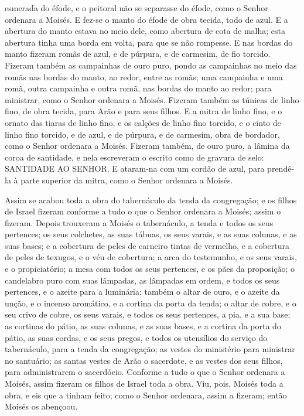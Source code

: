 esmerada do éfode, e o peitoral não se separasse do éfode, como o
Senhor ordenara a Moisés. E fez-se o manto do éfode de obra
tecida, todo de azul. E a abertura do manto estava no meio
dele, como abertura de cota de malha; esta abertura tinha uma borda
em volta, para que se não rompesse. E nas bordas do manto
fizeram romãs de azul, e de púrpura, e de carmesim, de fio torcido.
Fizeram também as campainhas de ouro puro, pondo as
campainhas no meio das romãs nas bordas do manto, ao redor, entre as
romãs; uma campainha e uma romã, outra campainha e outra
romã, nas bordas do manto ao redor; para ministrar, como o Senhor
ordenara a Moisés. Fizeram também as túnicas de linho fino,
de obra tecida, para Arão e para seus filhos. E a mitra de
linho fino, e o ornato das tiaras de linho fino, e os calções de
linho fino torcido, e o cinto de linho fino torcido, e de
azul, e de púrpura, e de carmesim, obra de bordador, como o Senhor
ordenara a Moisés. Fizeram também, de ouro puro, a lâmina da
coroa de santidade, e nela escreveram o escrito como de gravura de
selo: SANTIDADE AO SENHOR. E ataram-na com um cordão de azul,
para prendê-la à parte superior da mitra, como o Senhor ordenara a
Moisés.

Assim se acabou toda a obra do tabernáculo da tenda da
congregação; e os filhos de Israel fizeram conforme a tudo o que o
Senhor ordenara a Moisés; assim o fizeram. Depois trouxeram a
Moisés o tabernáculo, a tenda e todos os seus pertences; os seus
colchetes, as suas tábuas, os seus varais, e as suas colunas, e as
suas bases; e a cobertura de peles de carneiro tintas de
vermelho, e a cobertura de peles de texugos, e o véu de cobertura;
a arca do testemunho, e os seus varais, e o propiciatório;
a mesa com todos os seus pertences, e os pães da proposição;
o candelabro puro com suas lâmpadas, as lâmpadas em ordem, e
todos os seus pertences, e o azeite para a luminária; também
o altar de ouro, e o azeite da unção, e o incenso aromático, e a
cortina da porta da tenda; o altar de cobre, e o seu crivo de
cobre, os seus varais, e todos os seus pertences, a pia, e a sua
base; as cortinas do pátio, as suas colunas, e as suas bases,
e a cortina da porta do pátio, as suas cordas, e os seus pregos, e
todos os utensílios do serviço do tabernáculo, para a tenda da
congregação; as vestes do ministério para ministrar no
santuário; as santas vestes de Arão o sacerdote, e as vestes dos
seus filhos, para administrarem o sacerdócio. Conforme a tudo
o que o Senhor ordenara a Moisés, assim fizeram os filhos de Israel
toda a obra. Viu, pois, Moisés toda a obra, e eis que a
tinham feito; como o Senhor ordenara, assim a fizeram; então Moisés
os abençoou.

